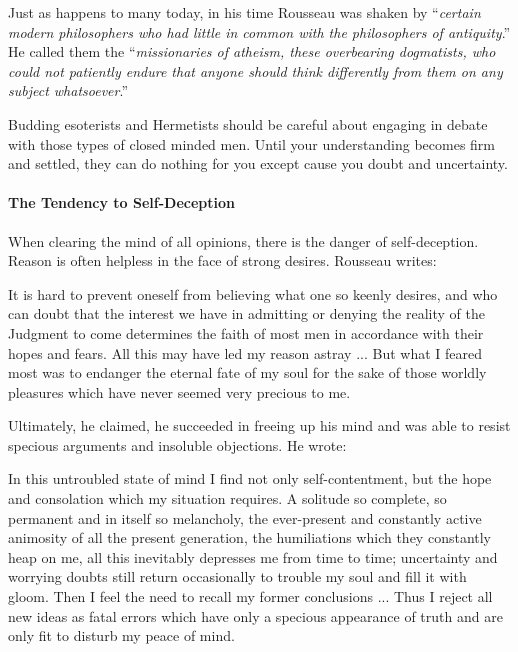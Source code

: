 Just as happens to many today, in his time Rousseau was shaken by ``\emph{certain modern philosophers who had little in common with the philosophers of antiquity}.'' He called them the ``\emph{missionaries of atheism, these overbearing dogmatists, who could not patiently endure that anyone should think differently from them on any subject whatsoever}.''

Budding esoterists and Hermetists should be careful about engaging in debate with those types of closed minded men. Until your understanding becomes firm and settled, they can do nothing for you except cause you doubt and uncertainty.

\paragraph{The Tendency to Self-Deception}


When clearing the mind of all opinions, there is the danger of self-deception. Reason is often helpless in the face of strong desires. Rousseau writes:

\begin{quotex}
It is hard to prevent oneself from believing what one so keenly desires, and who can doubt that the interest we have in admitting or denying the reality of the Judgment to come determines the faith of most men in accordance with their hopes and fears. All this may have led my reason astray ... But what I feared most was to endanger the eternal fate of my soul for the sake of those worldly pleasures which have never seemed very precious to me.
\end{quotex}


Ultimately, he claimed, he succeeded in freeing up his mind and was able to resist specious arguments and insoluble objections. He wrote:

\begin{quotex}
In this untroubled state of mind I find not only self-contentment, but the hope and consolation which my situation requires. A solitude so complete, so permanent and in itself so melancholy, the ever-present and constantly active animosity of all the present generation, the humiliations which they constantly heap on me, all this inevitably depresses me from time to time; uncertainty and worrying doubts still return occasionally to trouble my soul and fill it with gloom. Then I feel the need to recall my former conclusions ... Thus I reject all new ideas as fatal errors which have only a specious appearance of truth and are only fit to disturb my peace of mind.
\end{quotex}


